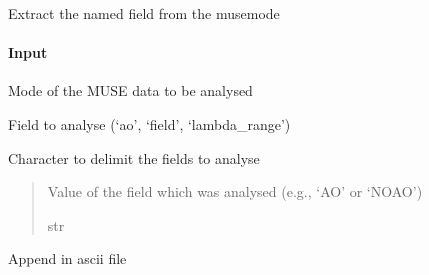 \documentclass[letterpaper,10pt,english]{sphinxmanual}
\begin{document}
\begin{fulllineitems}
\label{\detokenize{api/pymusepipe:pymusepipe.util_pipe.analyse_musemode}}
\pysigstartsignatures
{}
\pysigstopsignatures
\sphinxAtStartPar
Extract the named field from the musemode


\paragraph{Input}
\label{\detokenize{api/pymusepipe:id159}}\begin{description}
\sphinxAtStartPar
Mode of the MUSE data to be analysed

\sphinxAtStartPar
Field to analyse (‘ao’, ‘field’, ‘lambda\_range’)

\sphinxAtStartPar
Character to delimit the fields to analyse

\end{description}
\begin{quote}\begin{description}
\sphinxAtStartPar
{} \textendash{} Value of the field which was analysed (e.g., ‘AO’ or ‘NOAO’)

\sphinxAtStartPar
str

\end{description}\end{quote}

\end{fulllineitems}


\begin{fulllineitems}
\label{\detokenize{api/pymusepipe:pymusepipe.util_pipe.append_file}}
\pysigstartsignatures
{}
\pysigstopsignatures
\sphinxAtStartPar
Append in ascii file

\end{fulllineitems}
\end{document}
